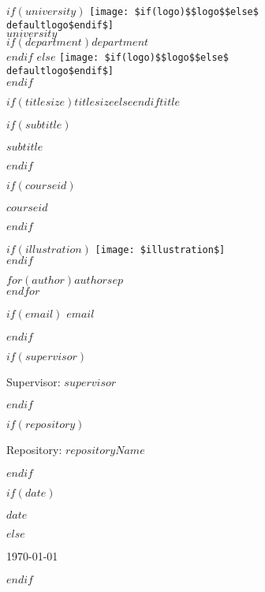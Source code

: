 \documentclass[12pt,a4paper]{article}
\def\defaultlogo{images/unige.pdf}
\begin{document}
\begin{titlepage}
    \centering

    $if(university)$
      \texttt{[image: \$if(logo)\$\$logo\$\$else\$\\defaultlogo\$endif\$]}\\[0.8cm]
      {\Large\textsc{$university$}}\\
      $if(department)${\large $department$}\\[1.2cm]$endif$
    $else$
      \texttt{[image: \$if(logo)\$\$logo\$\$else\$\\defaultlogo\$endif\$]}\\[2cm]
    $endif$

    {$if(titlesize)$$titlesize$$else$\Huge$endif$\bfseries\scshape $title$\par}

    $if(subtitle)$
      \vspace{0.6cm}
      {\Large $subtitle$\par}
    $endif$

    $if(courseid)$
      \vspace{0.3cm}
      {\large $courseid$\par}
    $endif$

    \vspace{1.2cm}

    $if(illustration)$
      \texttt{[image: \$illustration\$]}\\[1.2cm]
    $endif$

    {\Large $for(author)$$author$$sep$ \\ $endfor$\par}

    $if(email)$
      \vspace{0.3cm}
      \href{mailto:$email$}{\texttt{$email$}}\par
    $endif$

    $if(supervisor)$
      \vspace{0.5cm}
      {\small Supervisor: \textit{$supervisor$}\par}
    $endif$

    $if(repository)$
      \vspace{0.5cm}
      {\small Repository: \href{$repository$}{$repositoryName$}\par}
    $endif$

    \vfill

    $if(date)$
      {\large $date$\par}
    $else$
      {\large \today\par}
    $endif$

\end{titlepage}
\end{document}
